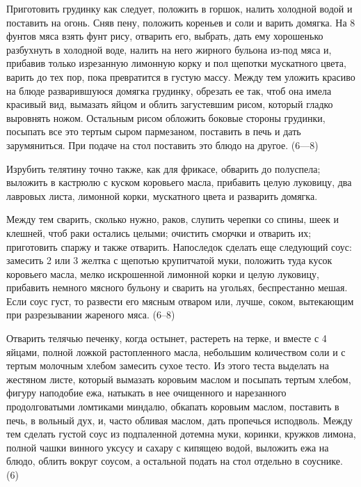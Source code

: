 
Приготовить грудинку как следует, положить в горшок, налить холодной водой и поставить на огонь. Сняв пену, положить кореньев и соли и варить домягка. На 8 фунтов мяса взять фунт рису, отварить его, выбрать, дать ему хорошенько разбухнуть в холодной воде, налить на него жирного бульона из-под мяса и, прибавив только изрезанную лимонную корку и пол щепотки мускатного цвета, варить до тех пор, пока превратится в густую массу. Между тем уложить красиво на блюде разварившуюся домягка грудинку, обрезать ее так, чтоб она имела красивый вид, вымазать яйцом и облить загустевшим рисом, который гладко выровнять ножом. Остальным рисом обложить боковые стороны грудинки, посыпать все это тертым сыром пармезаном, поставить в печь и дать зарумяниться. При подаче на стол поставить это блюдо на другое. (6—8) 


Изрубить телятину точно также, как для фрикасе, обварить до полуспела; выложить в кастрюлю с куском коровьего масла, прибавить целую луковицу, два лавровых листа, лимонной корки, мускатного цвета и разварить домягка. 

Между тем сварить, сколько нужно, раков, слупить черепки со спины, шеек и клешней, чтоб раки остались целыми; очистить сморчки и отварить их; приготовить спаржу и также отварить. Напоследок сделать еще следующий соус: замесить 2 или 3 желтка с щепотью крупитчатой муки, положить туда кусок коровьего масла, мелко искрошенной лимонной корки и целую луковицу, прибавить немного мясного бульону и сварить на угольях, беспрестанно мешая. Если соус густ, то развести его мясным отваром или, лучше, соком, вытекающим при разрезывании жареного мяса. (6--8) 


Отварить телячью печенку, когда остынет, растереть на терке, и вместе с 4 яйцами, полной ложкой растопленного масла, небольшим количеством соли и с тертым молочным хлебом замесить сухое тесто. Из этого теста выделать на жестяном листе, который вымазать коровьим маслом и посыпать тертым хлебом, фигуру наподобие ежа, натыкать в нее очищенного и нарезанного продолговатыми ломтиками миндалю, обкапать коровьим маслом, поставить в печь, в вольный дух, и, часто обливая маслом, дать пропечься исподволь. Между тем сделать густой соус из подпаленной дотемна муки, коринки, кружков лимона, полной чашки винного уксусу и сахару с кипящею водой, выложить ежа на блюдо, облить вокруг соусом, а остальной подать на стол отдельно в соуснике. (6) 

